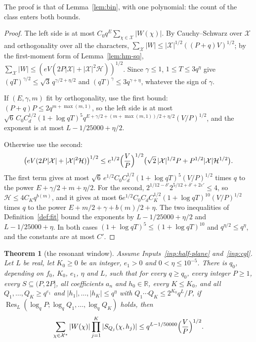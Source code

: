 \documentclass[11pt]{article}
\newtheorem{theorem}{Theorem}[section]
\theoremstyle{definition}
\begin{document}
The proof is that of Lemma~\ref{lem:bin}, with one polynomial: the count of the class enters both bounds.

\begin{proof}
The left side is at most $C_0 q^E \sum_{\chi \in \mathcal X} |W(\chi)|$. By Cauchy--Schwarz over $\mathcal X$ and
orthogonality over all the characters, $\sum_{\mathcal X} |W| \le |\mathcal X|^{1/2}((P + q)V)^{1/2}$; by the
first-moment form of Lemma~\ref{lem:hm-sq}, $\sum_{\mathcal X} |W| \le (eV(2P|\mathcal X| + |\mathcal X|^2
\mathcal H))^{1/2}$. Since $\gamma \le 1$, $1 \le T \le 3q^\eta$ give $(qT)^{\gamma/2} \le \sqrt3\, q^{\gamma/2 +
\eta/2}$ and $(qT)^\gamma \le 3 q^{\gamma + \eta}$, whatever the sign of $\gamma$.

If $(E, \gamma, m)$ fit by orthogonality, use the first bound: $(P + q)P \le 2q^{m + \max(m, 1)}$, so the left side is
at most $\sqrt6\, C_0 C_d^{1/2} (1 + \log qT)^5 q^{E + \gamma/2 + (m + \max(m, 1))/2 + \eta/2} (V/P)^{1/2}$, and the
exponent is at most $L - 1/25000 + \eta/2$.

Otherwise use the second:
\[
  \bigl(eV(2P|\mathcal X| + |\mathcal X|^2\mathcal H)\bigr)^{1/2} \le e^{1/2}\Bigl(\frac VP\Bigr)^{1/2}\bigl(\sqrt2\,
  |\mathcal X|^{1/2} P + P^{1/2} |\mathcal X| \mathcal H^{1/2}\bigr).
\]
The first term gives at most $\sqrt6\, e^{1/2} C_0 C_d^{1/2} (1 + \log qT)^5 (V/P)^{1/2}$ times $q$ to the power $E +
\gamma/2 + m + \eta/2$. For the second, $2^{1/12 - \delta'} 2^{5/12 + \delta' + 2\varepsilon'} \le 4$, so $\mathcal H
\le 4C_K q^{b(m)}$, and it gives at most $6 e^{1/2} C_0 C_d C_K^{1/2} (1 + \log qT)^{10} (V/P)^{1/2}$ times $q$ to the
power $E + m/2 + \gamma + b(m)/2 + \eta$. The two inequalities of Definition~\ref{def:fit} bound the exponents by $L -
1/25000 + \eta/2$ and $L - 1/25000 + \eta$. In both cases $(1 + \log qT)^5 \le (1 + \log qT)^{10}$ and $q^{\eta/2} \le
q^\eta$, and the constants are at most $C'$.
\end{proof}

\begin{theorem}[the resonant window]\label{thm:window}
Assume Inputs~\ref{inp:half-plane} and~\ref{inp:cgl}. Let $L$ be real, let $K_0 \ge 0$ be an integer, $e_1 > 0$ and $0
< \eta \le 10^{-5}$. There is $q_0$, depending on $f_0$, $K_0$, $e_1$, $\eta$ and $L$, such that for every $q \ge q_0$,
every integer $P \ge 1$, every $S \subseteq (P, 2P]$, all coefficients $a_n$ and $h_0 \in \mathbb R$, every $K \le
K_0$, and all $Q_1, \dots, Q_K \ge q^{e_1}$ and $|h_1|, \dots, |h_K| \le q^\eta$ with $Q_1 \cdots Q_K \le 2^{K_0}
q^L/P$, if $\operatorname{Res}_L(\log_q P; \log_q Q_1, \dots, \log_q Q_K)$ holds, then
\[
  \sum_{\chi \in \mathcal X^*} |W(\chi)| \prod_{j=1}^K |S_{Q_j}(\chi, h_j)| \le q^{L - 1/50000} \Bigl(\frac VP
  \Bigr)^{1/2}.
\]
\end{theorem}
\end{document}
